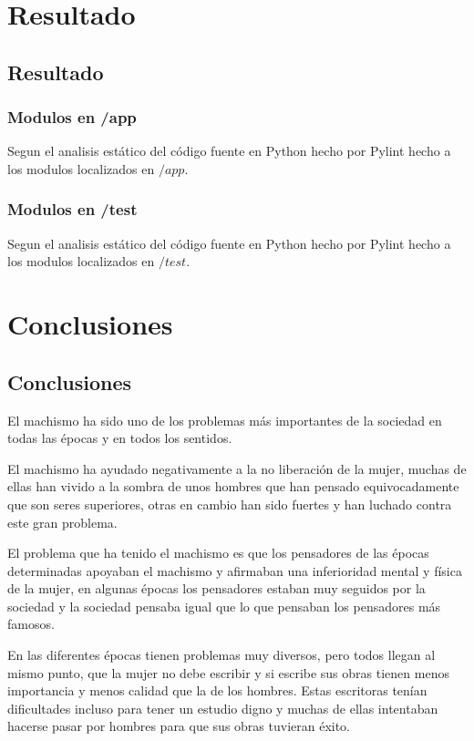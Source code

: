 \documentclass[oneside]{book}
\begin{document}
\chapter{Resultado}
\section{Resultado}
\subsection{Modulos en /app}
Segun el analisis estático del código fuente en Python hecho por Pylint hecho a los modulos localizados en $/app$.

\subsection{Modulos en /test}
Segun el analisis estático del código fuente en Python hecho por Pylint hecho a los modulos localizados en $/test$.



\chapter{Conclusiones}
\section{Conclusiones}
El machismo ha sido uno de los problemas más importantes de la sociedad en todas las épocas y en todos los sentidos.

El machismo ha ayudado negativamente a la no liberación de la mujer, muchas de ellas han vivido a la sombra de unos hombres que han pensado equivocadamente que son seres superiores, otras en cambio han sido fuertes y han luchado contra este gran problema.

El problema que ha tenido el machismo es que los pensadores de las épocas determinadas apoyaban el machismo y afirmaban una inferioridad mental y física de la mujer, en algunas épocas los pensadores estaban muy seguidos por la sociedad y la sociedad pensaba igual que lo que pensaban los pensadores más famosos.

En las diferentes épocas tienen problemas muy diversos, pero todos llegan al mismo punto, que la mujer no debe escribir y si escribe sus obras tienen menos importancia y menos calidad que la de los hombres. Estas escritoras tenían dificultades incluso para tener un estudio digno y muchas de ellas intentaban hacerse pasar por hombres para que sus obras tuvieran éxito.
\end{document}
